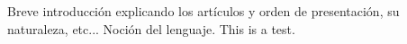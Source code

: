 Breve introducción explicando los artículos y orden de presentación, su naturaleza, etc...
Noción del lenguaje.
This is a test.
